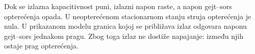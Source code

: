 Dok se izlazna kapacitivnost puni, izlazni napon raste, a napon gejt–sors opterećenja opada. U neopterećenom stacionarnom stanju struja opterećenja je nula. U prikazanom modelu granica kojoj se približava izlaz odgovara naponu gejt–sors jednakom pragu. Zbog toga izlaz ne dostiže napajanje: između njih ostaje prag opterećenja.
